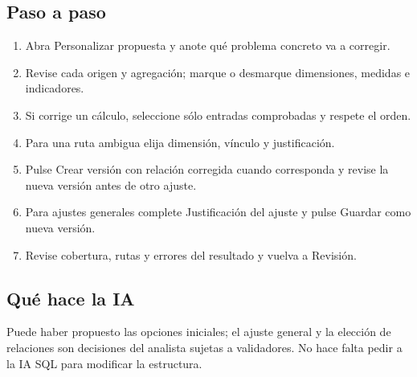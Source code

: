 \subsection{Paso a paso}
\begin{enumerate}
\item Abra Personalizar propuesta y anote qué problema concreto va a corregir.\par\nopagebreak[4]
\item Revise cada origen y agregación; marque o desmarque dimensiones, medidas e indicadores.\par\nopagebreak[4]
\item Si corrige un cálculo, seleccione sólo entradas comprobadas y respete el orden.\par\nopagebreak[4]
\item Para una ruta ambigua elija dimensión, vínculo y justificación.\par\nopagebreak[4]
\item Pulse Crear versión con relación corregida cuando corresponda y revise la nueva versión antes de otro ajuste.\par\nopagebreak[4]
\item Para ajustes generales complete Justificación del ajuste y pulse Guardar como nueva versión.\par\nopagebreak[4]
\item Revise cobertura, rutas y errores del resultado y vuelva a Revisión.\par\nopagebreak[4]
\end{enumerate}
\subsection{Qué hace la IA}
Puede haber propuesto las opciones iniciales; el ajuste general y la elección de relaciones son decisiones del analista sujetas a validadores. No hace falta pedir a la IA SQL para modificar la estructura.


